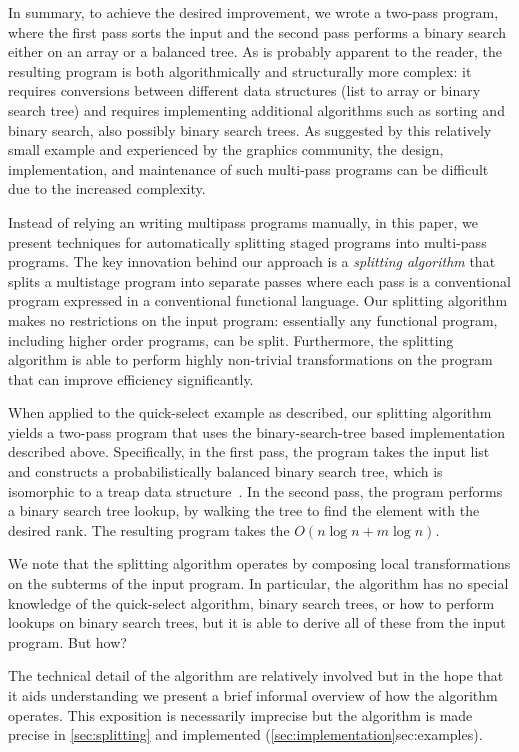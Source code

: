 \begin{abstrsyn}
In summary, to achieve the desired improvement, we wrote a two-pass
program, where the first pass sorts the input and the second pass
performs a binary search either on an array or a balanced tree. As is
probably apparent to the reader, the resulting program is both
algorithmically and structurally more complex: it requires conversions
between different data structures (list to array or binary search
tree) and requires implementing additional algorithms such as sorting
and binary search, also possibly binary search trees.  As suggested by
this relatively small example and experienced by the graphics
community, the design, implementation, and maintenance of such
multi-pass programs can be difficult due to the increased complexity.


Instead of relying an writing multipass programs manually, in this
paper, we present techniques for automatically splitting staged
programs into multi-pass programs.  The key innovation behind our
approach is a {\em splitting algorithm} that splits a multistage
program into separate passes where each pass is a conventional program
expressed in a conventional functional language.  Our splitting
algorithm makes no restrictions on the input program: essentially any
functional program, including higher order programs, can be split.
Furthermore, the splitting algorithm is able to perform highly
non-trivial transformations on the program that can improve efficiency
significantly. 

When applied to the quick-select example as described, our splitting
algorithm yields a two-pass program that uses the binary-search-tree
based implementation described above.  Specifically, in the first
pass, the program takes the input list and constructs a
probabilistically balanced binary search tree, which is isomorphic to
a treap data structure~\cite{treaps}.  In the second pass, the program
performs a binary search tree lookup, by walking the tree to find the
element with the desired rank.  The resulting program takes the
$O(n\log{n} + m\log{n})$.

We note that the splitting algorithm operates by composing local
transformations on the subterms of the input program.  In particular,
the algorithm has no special knowledge of the quick-select algorithm,
binary search trees, or how to perform lookups on binary search trees,
but it is able to derive all of these from the input program.  But
how? 

The technical detail of the algorithm are relatively involved but in
the hope that it aids understanding we present a brief informal
overview of how the algorithm operates.  This exposition is
necessarily imprecise but the algorithm is made precise in
\ref{sec:splitting} and implemented
(\ref{sec:implementation}{sec:examples}).


\end{abstrsyn}
